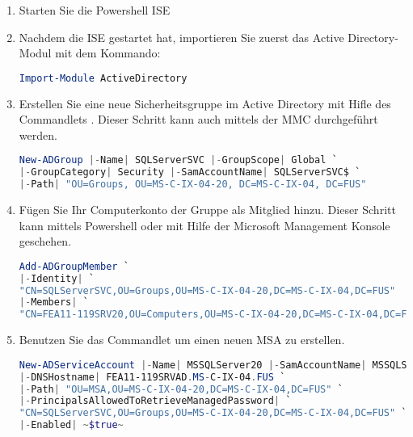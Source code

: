         \begin{enumerate}
            \item Starten Sie die Powershell ISE
            \item Nachdem die ISE gestartet hat, importieren Sie zuerst das
            Active Directory-Modul mit dem Kommando:
            \begin{lstlisting}[language=powershell, caption={Importieren des
            Active Directory-Moduls für Windows Powershell}, label=create_msa_1]
Import-Module ActiveDirectory
            \end{lstlisting}
            \item Erstellen Sie eine neue Sicherheitsgruppe im Active Directory
            mit Hifle des Commandlets . Dieser
            Schritt kann auch mittels der MMC durchgeführt werden.
            \begin{lstlisting}[language=powershell, caption={Eine globale
            Sicherheitsgruppe erstellen}, label=create_msa_2]
New-ADGroup |-Name| SQLServerSVC |-GroupScope| Global `
|-GroupCategory| Security |-SamAccountName| SQLServerSVC$ `
|-Path| "OU=Groups, OU=MS-C-IX-04-20, DC=MS-C-IX-04, DC=FUS"
            \end{lstlisting}
            \item Fügen Sie Ihr Computerkonto der Gruppe 
            als Mitglied hinzu. Dieser Schritt kann mittels Powershell oder mit
            Hilfe der Microsoft Management Konsole geschehen.
            \begin{lstlisting}[language=powershell, caption={Einer Gruppe ein
            Mitglied hinzufügen}, label=create_msa_3]
Add-ADGroupMember `
|-Identity| `
"CN=SQLServerSVC,OU=Groups,OU=MS-C-IX-04-20,DC=MS-C-IX-04,DC=FUS"
|-Members| `
"CN=FEA11-119SRV20,OU=Computers,OU=MS-C-IX-04-20,DC=MS-C-IX-04,DC=FUS"
            \end{lstlisting}
            \item Benutzen Sie das Commandlet  um
            einen neuen MSA zu erstellen.
            \begin{lstlisting}[language=powershell, caption={Erstellen des MSA},
            label=create_msa_4]
New-ADServiceAccount |-Name| MSSQLServer20 |-SamAccountName| MSSQLServer20$ `
|-DNSHostname| FEA11-119SRVAD.MS-C-IX-04.FUS `
|-Path| "OU=MSA,OU=MS-C-IX-04-20,DC=MS-C-IX-04,DC=FUS" `
|-PrincipalsAllowedToRetrieveManagedPassword| `
"CN=SQLServerSVC,OU=Groups,OU=MS-C-IX-04-20,DC=MS-C-IX-04,DC=FUS" `
|-Enabled| ~$true~
            \end{lstlisting}
        \end{enumerate}
